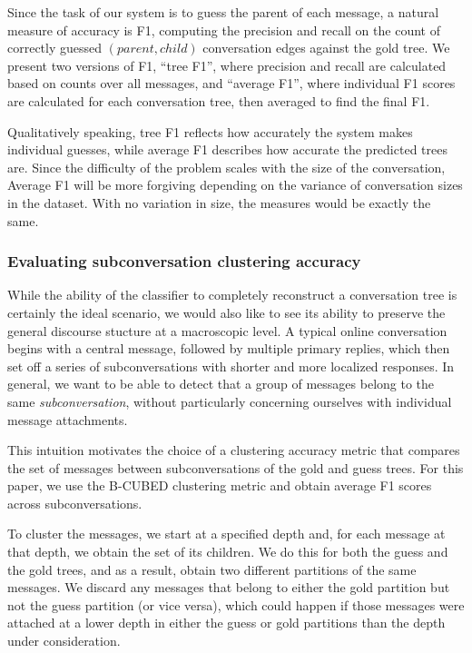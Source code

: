 \documentclass{article}
\begin{document}
Since the task of our system is to guess the parent of each message, a natural
measure of accuracy is F1, computing the precision and recall on the count of
correctly guessed $(parent,child)$ conversation edges against the gold tree. We
present two versions of F1, ``tree F1'', where precision and recall are calculated
based on counts over all messages, and ``average F1'', where individual F1 scores
are calculated for each conversation tree, then averaged to find the final F1.

Qualitatively speaking, tree F1 reflects how accurately the system
makes individual guesses, while average F1 describes how accurate the predicted
trees are. Since the difficulty of the problem scales with the size of the
conversation, Average F1 will be more forgiving depending on the variance of
conversation sizes in the dataset. With no variation in size, the measures would
be exactly the same.

\subsubsection{Evaluating subconversation clustering accuracy}
While the ability of the classifier to completely reconstruct a conversation
tree is certainly the ideal scenario, we would also like to see its ability to
preserve the general discourse stucture at a macroscopic level. A typical
online conversation begins with a central message, followed by multiple
primary replies, which then set off a series of subconversations with shorter
and more localized responses. In general, we want to be able to detect that a
group of messages belong to the same \emph{subconversation}, without
particularly concerning ourselves with individual message attachments.

This intuition motivates the choice of a clustering accuracy metric that
compares the set of messages between subconversations of the gold and guess
trees. For this paper, we use the B-CUBED clustering metric \cite{Bagga98} and
obtain average F1 scores across subconversations.

To cluster the messages, we start at a specified depth and, for each message
at that depth, we obtain the set of its children. We do this for both the
guess and the gold trees, and as a result, obtain two different partitions of
the same messages. We discard any messages that belong to either the gold
partition but not the guess partition (or vice versa), which could happen if
those messages were attached at a lower depth in either the guess or gold
partitions than the depth under consideration.
\end{document}
